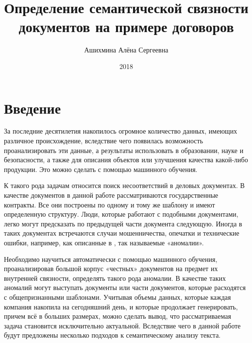 \documentclass[12pt]{article}
\author{Ашихмина Алёна Сергеевна}
\title{Определение семантической связности \\ документов на примере договоров}
\date{2018}
\newcounter{c_tab}
\begin{document}
\maketitle{}

\topmargin=-1.0cm
\setlength{\textheight}{20cm}
\setlength{\textwidth}{16cm}
\hoffset=-5mm
\voffset=10mm
\parindent=12mm

\newpage
\tableofcontents
\newpage



\section{Введение}
За последние десятилетия накопилось огромное количество данных, имеющих различное происхождение, вследствие чего появилась возможность проанализировать эти данные, а результаты использовать в образовании, науке и безопасности, а также для описания объектов или улучшения качества какой-либо продукции. Это можно сделать с помощью машинного обучения. 

К такого рода задачам относится поиск несоответствий в деловых документах. В качестве документов в данной работе рассматриваются государственные контракты. Все они построены по одному и тому же шаблону и имеют определенную структуру. Люди, которые работают с подобными документами, легко могут предсказать по предыдущей части документа следующую. Иногда в таких документах встречаются случаи мошенничества, опечатки и технические ошибки, например, как описанные в \cite{vedomosti,fontanka}, так называемые «аномалии». 

Необходимо научиться автоматически с помощью машинного обучения, проанализировав большой корпус «честных» документов на предмет их внутренней связности, определять такого рода аномалии. В качестве таких аномалий могут выступать документы или части документов, которые расходятся с общепризнанными шаблонами.
Учитывая объемы данных, которые каждая компания накопила на сегодняшний день, и которые продолжает генерировать, причем всё в больших размерах, можно сделать вывод, что рассматриваемая задача становится исключительно актуальной. Вследствие чего в данной работе будут предложены несколько подходов к семантическому анализу текста. 

\newpage
\end{document}
